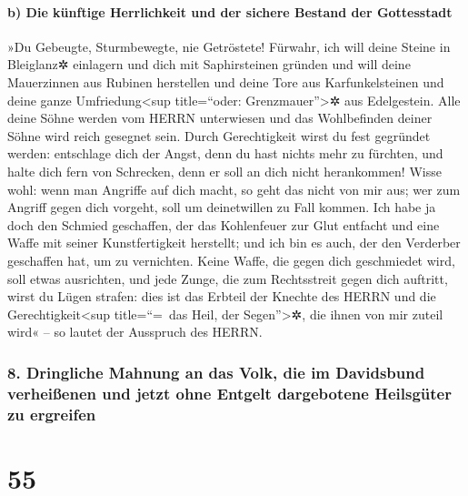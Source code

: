 \hypertarget{b-die-kuxfcnftige-herrlichkeit-und-der-sichere-bestand-der-gottesstadt}{%
\paragraph{b) Die künftige Herrlichkeit und der sichere Bestand der
Gottesstadt}\label{b-die-kuxfcnftige-herrlichkeit-und-der-sichere-bestand-der-gottesstadt}}

»Du Gebeugte, Sturmbewegte, nie Getröstete! Fürwahr, ich
will deine Steine in Bleiglanz✲ einlagern und dich mit Saphirsteinen
gründen und will deine Mauerzinnen aus Rubinen herstellen
und deine Tore aus Karfunkelsteinen und deine ganze
Umfriedung\textless sup title=``oder: Grenzmauer''\textgreater✲ aus
Edelgestein. Alle deine Söhne werden vom HERRN
unterwiesen und das Wohlbefinden deiner Söhne wird reich gesegnet sein.
Durch Gerechtigkeit wirst du fest gegründet werden:
entschlage dich der Angst, denn du hast nichts mehr zu fürchten, und
halte dich fern von Schrecken, denn er soll an dich nicht herankommen!
Wisse wohl: wenn man Angriffe auf dich macht, so geht das
nicht von mir aus; wer zum Angriff gegen dich vorgeht, soll um
deinetwillen zu Fall kommen. Ich habe ja doch den Schmied
geschaffen, der das Kohlenfeuer zur Glut entfacht und eine Waffe mit
seiner Kunstfertigkeit herstellt; und ich bin es auch, der den Verderber
geschaffen hat, um zu vernichten. Keine Waffe, die gegen
dich geschmiedet wird, soll etwas ausrichten, und jede Zunge, die zum
Rechtsstreit gegen dich auftritt, wirst du Lügen strafen: dies ist das
Erbteil der Knechte des HERRN und die Gerechtigkeit\textless sup
title=``=~das Heil, der Segen''\textgreater✲, die ihnen von mir zuteil
wird« -- so lautet der Ausspruch des HERRN.

\hypertarget{dringliche-mahnung-an-das-volk-die-im-davidsbund-verheiuxdfenen-und-jetzt-ohne-entgelt-dargebotene-heilsguxfcter-zu-ergreifen}{%
\subsubsection{8. Dringliche Mahnung an das Volk, die im Davidsbund
verheißenen und jetzt ohne Entgelt dargebotene Heilsgüter zu
ergreifen}\label{dringliche-mahnung-an-das-volk-die-im-davidsbund-verheiuxdfenen-und-jetzt-ohne-entgelt-dargebotene-heilsguxfcter-zu-ergreifen}}

\hypertarget{section-54}{%
\section{55}\label{section-54}}

